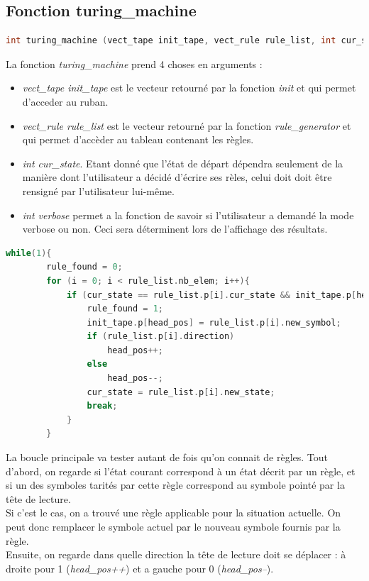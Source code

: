 \documentclass[12pt,a4paper]{report}
\begin{document}
\subsection{Fonction turing\_machine}
\begin{lstlisting}[language=c]
int turing_machine (vect_tape init_tape, vect_rule rule_list, int cur_state, int verbose){
\end{lstlisting}
La fonction \textit{turing\_machine} prend 4 choses en arguments :
\begin{itemize}
\item \textit{vect\_tape init\_tape} est le vecteur retourné par la fonction \textit{init} et qui permet d'acceder au ruban.
\item \textit{vect\_rule rule\_list} est le vecteur retourné par la fonction \textit{rule\_generator} et qui permet d'accèder au tableau contenant les règles.
\item \textit{int cur\_state}. Etant donné que l'état de départ dépendra seulement de la manière dont l'utilisateur a décidé d'écrire ses rèles, celui doit doit être rensigné par l'utilisateur lui-même.
\item \textit{int verbose} permet a la fonction de savoir si l'utilisateur a demandé la mode verbose ou non. Ceci sera déterminent lors de l'affichage des résultats.
\end{itemize}
\begin{lstlisting}[language=c]
while(1){
		rule_found = 0;
		for (i = 0; i < rule_list.nb_elem; i++){
			if (cur_state == rule_list.p[i].cur_state && init_tape.p[head_pos] == rule_list.p[i].symbol){
				rule_found = 1;
				init_tape.p[head_pos] = rule_list.p[i].new_symbol;
				if (rule_list.p[i].direction)
					head_pos++;
				else
					head_pos--;
				cur_state = rule_list.p[i].new_state;
				break;
			}
		}
\end{lstlisting}
La boucle principale va tester autant de fois qu'on connait de règles. Tout d'abord, on regarde si l'état courant correspond à un état décrit par un règle, et si un des symboles tarités par cette règle correspond au symbole pointé par la tête de lecture.\\
Si c'est le cas, on a trouvé une règle applicable pour la situation actuelle. On peut donc remplacer le symbole actuel par le nouveau symbole fournis par la règle. \\
Ensuite, on regarde dans quelle direction la tête de lecture doit se déplacer : à droite pour 1 (\textit{head\_pos++}) et a gauche pour 0 (\textit{head\_pos--}).\\
\end{document}
